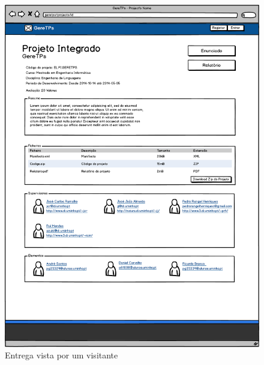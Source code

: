 \begin{figure}[htbp] 
        \centering
        \includegraphics[width=1\textwidth]{images/prototipos/mockups/projetovisitante.png}
         \caption{Entrega vista por um visitante}
         \label{fig: projetoaluno}
\end{figure}









